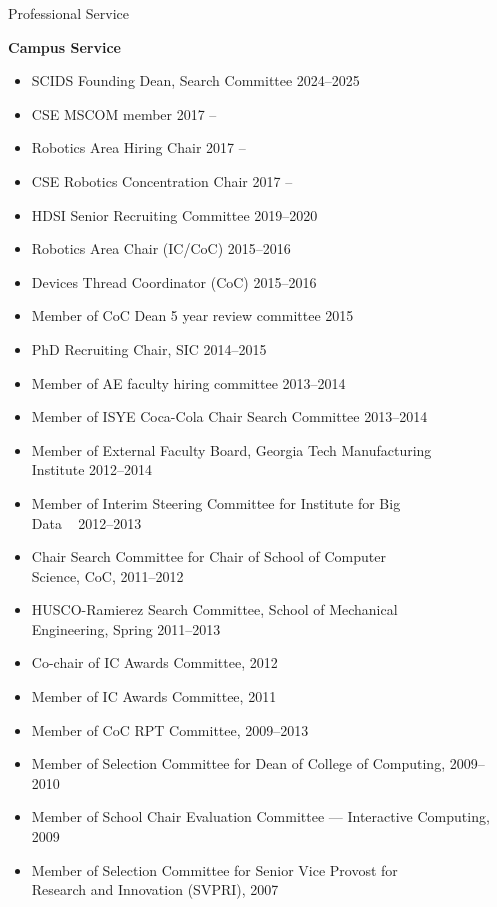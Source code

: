 \documentclass{article}
\begin{document}
\begin{cv}
\begin{cvlist}{Professional Service}
\item {\bf Campus Service}
  \begin{itemize}
  \item SCIDS Founding Dean, Search Committee \cftdotfill{\cftdotsep} 2024--2025
  \item CSE MSCOM member \cftdotfill{\cftdotsep} 2017 --
  \item Robotics Area Hiring Chair \cftdotfill{\cftdotsep} 2017 --
  \item CSE Robotics Concentration Chair \cftdotfill{\cftdotsep}
    2017 --
  \item HDSI Senior Recruiting Committee  \cftdotfill{\cftdotsep} 2019--2020
  \item Robotics Area Chair (IC/CoC) \cftdotfill{\cftdotsep} 2015--2016
  \item Devices Thread Coordinator (CoC) \cftdotfill{\cftdotsep} 2015--2016
  \item Member of CoC Dean 5 year review committee
    \cftdotfill{\cftdotsep} 2015
  \item PhD Recruiting Chair, SIC \cftdotfill{\cftdotsep} 2014--2015
  \item Member of AE faculty hiring committee \cftdotfill{\cftdotsep}
    2013--2014
  \item Member of ISYE Coca-Cola Chair Search Committee
    \cftdotfill{\cftdotsep} 2013--2014
  \item Member of External Faculty Board, Georgia Tech Manufacturing\\
    Institute \cftdotfill{\cftdotsep} 2012--2014
  \item Member of Interim Steering Committee for Institute for Big
    \\Data \ \cftdotfill{\cftdotsep} 2012--2013
  \item Chair Search Committee for Chair of School of Computer\\
    Science, CoC, \cftdotfill{\cftdotsep} 2011--2012
  \item HUSCO-Ramierez Search Committee, School of Mechanical\\
    Engineering, Spring \cftdotfill{\cftdotsep} 2011--2013
  \item Co-chair of IC Awards Committee, \cftdotfill{\cftdotsep} 2012
  \item Member of IC Awards Committee, \cftdotfill{\cftdotsep} 2011
  \item Member of CoC RPT Committee, \cftdotfill{\cftdotsep} 2009--2013
  \item Member of Selection Committee for Dean of College of
    Computing, \cftdotfill{\cftdotsep} 2009--2010
  \item Member of School Chair Evaluation Committee --- Interactive
    Computing, \cftdotfill{\cftdotsep} 2009
  \item Member of Selection Committee for Senior Vice Provost for \\
    Research and Innovation (SVPRI), \cftdotfill{\cftdotsep} 2007
  \end{itemize}


\end{cvlist}
\end{cv}
\end{document}
